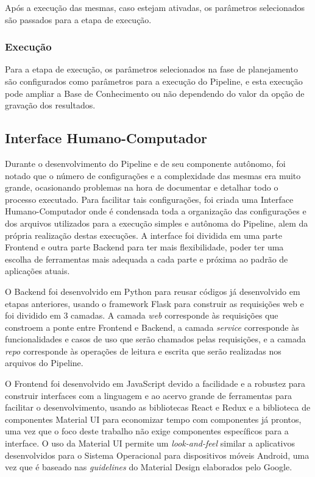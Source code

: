 \documentclass[portugues]{ic-tese}
\begin{document}
Após a execução das mesmas, caso estejam ativadas, os parâmetros selecionados são passados para a etapa de execução.

\subsubsection{Execução}

Para a etapa de execução, os parâmetros selecionados na fase de planejamento são configurados como parâmetros para a execução do Pipeline, e esta execução pode ampliar a Base de Conhecimento ou não dependendo do valor da opção de gravação dos resultados.

\subsection{Interface Humano-Computador}

Durante o desenvolvimento do Pipeline e de seu componente autônomo, foi notado que o número de configurações e a complexidade das mesmas era muito grande, ocasionando problemas na hora de documentar e detalhar todo o processo executado. Para facilitar tais configurações, foi criada uma Interface Humano-Computador onde é condensada toda a organização das configurações e dos arquivos utilizados para a execução simples e autônoma do Pipeline, alem da própria realização destas execuções. A interface foi dividida em uma parte Frontend e outra parte Backend para ter mais flexibilidade, poder ter uma escolha de ferramentas mais adequada a cada parte e próxima ao padrão de aplicações atuais.

O Backend foi desenvolvido em Python para reusar códigos já desenvolvido em etapas anteriores, usando o framework Flask para construir as requisições web e foi dividido em 3 camadas. A camada \textit{web} corresponde às requisições que constroem a ponte entre Frontend e Backend, a camada \textit{service} corresponde às funcionalidades e casos de uso que serão chamados pelas requisições, e a camada \textit{repo} corresponde às operações de leitura e escrita que serão realizadas nos arquivos do Pipeline.

O Frontend foi desenvolvido em JavaScript devido a facilidade e a robustez para construir interfaces com a linguagem e ao acervo grande de ferramentas para facilitar o desenvolvimento, usando as bibliotecas React e Redux e a biblioteca de componentes Material UI para economizar tempo com componentes já prontos, uma vez que o foco deste trabalho não exige componentes específicos para a interface. O uso da Material UI permite um \textit{look-and-feel} similar a aplicativos desenvolvidos para o Sistema Operacional para dispositivos móveis Android, uma vez que é baseado nas \textit{guidelines} do Material Design elaborados pelo Google.
\end{document}
